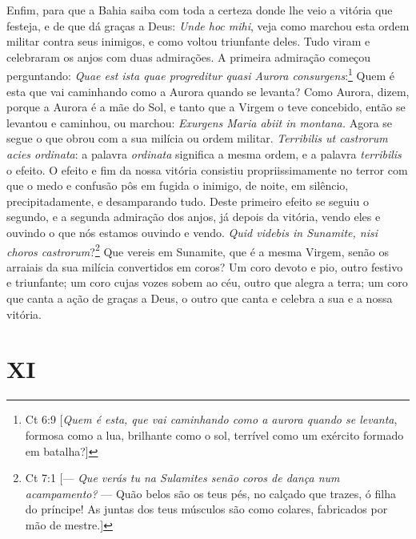 Enfim, para que a Bahia saiba com toda a certeza donde lhe veio a
vitória que festeja, e de que dá graças a Deus: \emph{Unde hoc mihi},
veja como marchou esta ordem militar contra seus inimigos, e como voltou
triunfante deles. Tudo viram e celebraram os anjos com duas admirações.
A primeira admiração começou perguntando: \emph{Quae est ista quae
progreditur quasi Aurora consurgens}:\footnote{Ct 6:9 [\textit{Quem é esta, que vai caminhando como a aurora quando se levanta}, formosa como a lua, brilhante como o sol, terrível como um exército formado em batalha?]} Quem é esta
que vai caminhando como a Aurora quando se levanta? Como Aurora,
dizem, porque a Aurora é a mãe do Sol, e tanto que a Virgem o teve
concebido, então se levantou e caminhou, ou marchou: \emph{Exurgens
Maria abiit in montana.} Agora se segue o que obrou com a sua milícia
ou ordem militar. \emph{Terribilis ut castrorum acies ordinata}:
a palavra \emph{ordinata} significa a mesma ordem, e a palavra
\emph{terribilis} o efeito. O efeito e fim da nossa vitória consistiu
propriissimamente no terror com que o medo e confusão pôs em fugida o
inimigo, de noite, em silêncio, precipitadamente, e desamparando tudo.
Deste primeiro efeito se seguiu o segundo, e a segunda admiração dos
anjos, já depois da vitória, vendo eles e ouvindo o que nós estamos
ouvindo e vendo. \emph{Quid videbis in Sunamite, nisi choros castrorum}?\footnote{Ct 7:1 [--- \textit{Que verás tu na Sulamites senão coros de dança num acampamento?} --- Quão belos são os teus pés, no calçado que trazes, ó filha do príncipe! As juntas dos teus músculos são como colares, fabricados por mão de mestre.]}
Que vereis em Sunamite, que é a mesma Virgem, senão os
arraiais da sua milícia convertidos em coros? Um coro devoto e pio,
outro festivo e triunfante; um coro cujas vozes sobem ao céu, outro que
alegra a terra; um coro que canta a ação de graças a Deus, o outro que
canta e celebra a sua e a nossa vitória.

\section*{XI}

